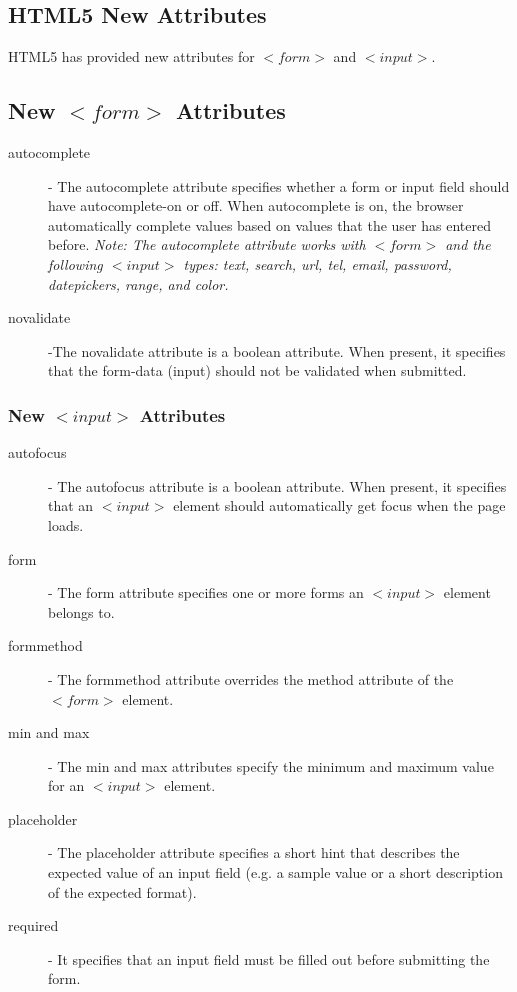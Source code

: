 \documentclass[11pt,a4paper]{article}
\begin{document}
\subsection*{HTML5 New Attributes}
HTML5 has provided new attributes for $<form>$ and $<input>$.

\subsection*{New $<form>$ Attributes}
\begin{description}
\item [autocomplete] - The autocomplete attribute specifies whether a form or input field should have autocomplete-on or off. When autocomplete is on, the browser automatically complete values based on values that the user has entered before.
\emph{Note: The autocomplete attribute works with $<form>$ and the following $<input>$ types: text, search, url, tel, email, password, datepickers, range, and color.}

\item[novalidate] -The novalidate attribute is a boolean attribute. When present, it specifies that the form-data (input) should not be validated when submitted.
\end{description}

\subsubsection*{New $<input>$ Attributes}
\begin{description}
\item [autofocus] - The autofocus attribute is a boolean attribute. When present, it specifies that an $<input>$ element should automatically get focus when the page loads.
\item [form] - The form attribute specifies one or more forms an $<input>$ element  belongs to.
\item [formmethod] - The formmethod attribute overrides the method attribute of the $<form>$ element.
\item [min and max] - The min and max attributes specify the minimum and maximum value for an $<input>$ element.
\item [placeholder] - The placeholder attribute specifies a short hint that describes the expected value of an input field (e.g. a sample value or a short description of the expected format).
\item [required] - It specifies that an input field must be filled out before submitting the form.
\end{description}
\end{document}
